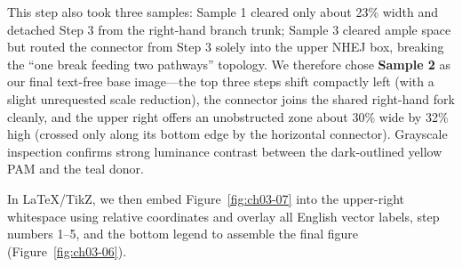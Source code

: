 This step also took three samples: Sample 1 cleared only about 23\% width and detached Step 3 from the right-hand branch trunk; Sample 3 cleared ample space but routed the connector from Step 3 solely into the upper NHEJ box, breaking the ``one break feeding two pathways'' topology. We therefore chose \textbf{Sample 2} as our final text-free base image—the top three steps shift compactly left (with a slight unrequested scale reduction), the connector joins the shared right-hand fork cleanly, and the upper right offers an unobstructed zone about 30\% wide by 32\% high (crossed only along its bottom edge by the horizontal connector). Grayscale inspection confirms strong luminance contrast between the dark-outlined yellow PAM and the teal donor.

In LaTeX/TikZ, we then embed Figure~\ref{fig:ch03-07} into the upper-right whitespace using relative coordinates and overlay all English vector labels, step numbers 1--5, and the bottom legend to assemble the final figure (Figure~\ref{fig:ch03-06}).

